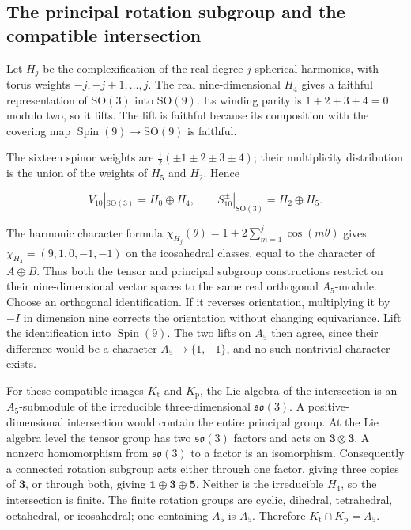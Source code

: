 \documentclass[11pt,a4paper]{article}
\begin{document}
\subsection{The principal rotation subgroup and the compatible intersection}\label{subsec:D4}

Let \(H_j\) be the complexification of the real degree-\(j\) spherical harmonics, with torus weights \(-j,-j+1,\ldots,j\). The real nine-dimensional \(H_4\) gives a faithful representation of \(\mathrm{SO}(3)\) into \(\mathrm{SO}(9)\). Its winding parity is \(1+2+3+4=0\) modulo two, so it lifts. The lift is faithful because its composition with the covering map \(\operatorname{Spin}(9)\to\mathrm{SO}(9)\) is faithful.

The sixteen spinor weights are \(\frac12(\pm1\pm2\pm3\pm4)\); their multiplicity distribution is the union of the weights of \(H_5\) and \(H_2\). Hence

\[
V_{10}|_{\mathrm{SO}(3)}=H_0\oplus H_4,\qquad
S_{10}^{\pm}|_{\mathrm{SO}(3)}=H_2\oplus H_5.
\]

The harmonic character formula \(\chi_{H_j}(\theta)=1+2\sum_{m=1}^j\cos(m\theta)\) gives \(\chi_{H_4}=(9,1,0,-1,-1)\) on the icosahedral classes, equal to the character of \(A\oplus B\). Thus both the tensor and principal subgroup constructions restrict on their nine-dimensional vector spaces to the same real orthogonal \(A_5\)-module. Choose an orthogonal identification. If it reverses orientation, multiplying it by \(-I\) in dimension nine corrects the orientation without changing equivariance. Lift the identification into \(\operatorname{Spin}(9)\). The two lifts on \(A_5\) then agree, since their difference would be a character \(A_5\to\{1,-1\}\), and no such nontrivial character exists.

For these compatible images \(K_{\mathrm t}\) and \(K_{\mathrm p}\), the Lie algebra of the intersection is an \(A_5\)-submodule of the irreducible three-dimensional \(\mathfrak{so}(3)\). A positive-dimensional intersection would contain the entire principal group. At the Lie algebra level the tensor group has two \(\mathfrak{so}(3)\) factors and acts on \(\mathbf3\otimes\mathbf3\). A nonzero homomorphism from \(\mathfrak{so}(3)\) to a factor is an isomorphism. Consequently a connected rotation subgroup acts either through one factor, giving three copies of \(\mathbf3\), or through both, giving \(\mathbf1\oplus\mathbf3\oplus\mathbf5\). Neither is the irreducible \(H_4\), so the intersection is finite. The finite rotation groups are cyclic, dihedral, tetrahedral, octahedral, or icosahedral; one containing \(A_5\) is \(A_5\). Therefore \(K_{\mathrm t}\cap K_{\mathrm p}=A_5\).
\end{document}

